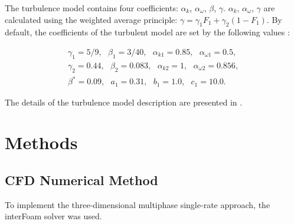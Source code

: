 \documentclass[mathematics,article,submit,pdftex,moreauthors]{Definitions/mdpi}
\begin{document}
The turbulence model contains four coefficients: $\alpha_k$, $\alpha_\omega$, $\beta$, $\gamma$. $\alpha_k$, $\alpha_\omega$, $\gamma$ are calculated using the weighted average principle: $\gamma = \gamma_1 F_1 + \gamma_2 (1 - F_1)$. By default, the coefficients of the turbulent model are set by the following values \cite{LaunderSpalding1974, Tahry1983, LaunderMorseRodiSpaldiug1972}:

\begin{linenomath}
\begin{equation}
	\label{kOmegaSstConstantsInit}
	\begin{aligned}
		\gamma_1 = 5 / 9,\ \ \ \beta_1 = 3 / 40,\ \ \ \alpha_{k1} = 0.85,\ \ \ \alpha_{\omega1} = 0.5,\\
		\gamma_2 = 0.44,\ \ \ \beta_2 = 0.083,\ \ \ \alpha_{k2} = 1,\ \ \ \alpha_{\omega 2} = 0.856,\\
		\beta^* = 0.09,\ \ \ a_1 = 0.31,\ \ \ b_1 = 1.0,\ \ \ c_1 = 10.0.
	\end{aligned}
\end{equation}
\end{linenomath}

The details of the turbulence model description are presented in \cite{Menter1993, MenterKuntzLangtry2003}.



 
\section{Methods}
\subsection{CFD Numerical Method}

To implement the three-dimensional multiphase single-rate approach, the interFoam \cite{Rusche2003ComputationalFD} solver was used.
\end{document}
